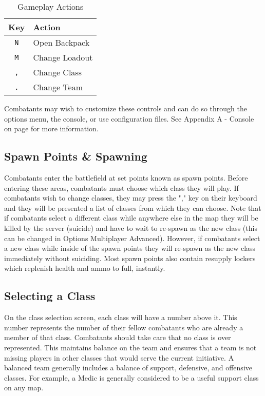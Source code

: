 \begin{table}[h!b!p!]
\caption{Gameplay Actions}
\begin{center}
\begin{tabular}{|c|l|}
	\hline
		Key & Action\\
	\hline
	\texttt{N}&Open Backpack\\
	\texttt{M}&Change Loadout\\
	\texttt{,}&Change Class\\
	\texttt{.}&Change Team\\
  	\hline
\end{tabular}
\end{center}
\label{table_gameplay_actions}
\end{table}

Combatants may wish to customize these controls and can do so through the options menu, the console, or use configuration files. See Appendix A - Console on page \pageref{Appendix_A_Console} for more information.

\subsection{Spawn Points \& Spawning}
Combatants enter the battlefield at set points known as spawn points. Before entering these areas, combatants must choose which class they will play. If combatants wish to change classes, they may press the "," key on their keyboard and they will be presented a list of classes from which they can choose. Note that if combatants select a different class while anywhere else in the map they will be killed by the server (suicide) and have to wait to re-spawn as the new class (this can be changed in Options Multiplayer Advanced). However, if combatants select a new class while inside of the spawn points they will re-spawn as the new class immediately without suiciding. Most spawn points also contain resupply lockers which replenish health and ammo to full, instantly.

\subsection{Selecting a Class}
On the class selection screen, each class will have a number above it. This number represents the number of their fellow combatants who are already a member of that class. Combatants should take care that no class is over represented. This maintains balance on the team and ensures that a team is not missing players in other classes that would serve the current initiative. A balanced team generally includes a balance of support, defensive, and offensive classes. For example, a Medic is generally considered to be a useful support class on any map.

